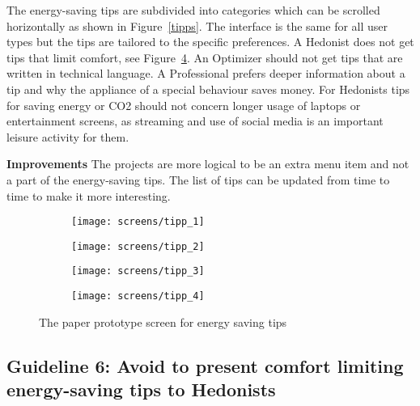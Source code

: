 The energy-saving tips are subdivided into categories which can be scrolled horizontally as shown in Figure~\ref{tipps}. The interface is the same for all user types but the tips are tailored to the specific preferences. A Hedonist does not get tips that limit comfort, see Figure~\ref{fig:tipps:hedonist}. An Optimizer should not get tips that are written in technical language. A Professional prefers deeper information about a tip and why the appliance of a special behaviour saves money. For Hedonists tips for saving energy or CO2 should not concern longer usage of laptops or entertainment screens, as streaming and use of social media is an important leisure activity for them.

\textbf{Improvements} \quad The projects are more logical to be an extra menu item and not a part of the energy-saving tips. The list of tips can be updated from time to time to make it more interesting.

\begin{figure}[h]
	\centering
	\begin{subfigure}[b]{0.24\columnwidth}
		\centering
		\texttt{[image: screens/tipp\_1]}
		\label{fig:tipps:professional}
	\end{subfigure}
	\begin{subfigure}[b]{0.24\columnwidth}
		\centering
		\texttt{[image: screens/tipp\_2]}
		\label{fig:tipps:optimizer}
	\end{subfigure}
	\begin{subfigure}[b]{0.24\columnwidth}
		\centering
		\texttt{[image: screens/tipp\_3]}
		\label{fig:tipps:indifferent}
	\end{subfigure}
	\begin{subfigure}[b]{0.24\columnwidth}
		\centering
		\texttt{[image: screens/tipp\_4]}
		\label{fig:tipps:hedonist}
	\end{subfigure}
	\caption{The paper prototype screen for energy saving tips}
	\label{fig:tipps} %
\end{figure}

\subsection*{Guideline 6: Avoid to present comfort limiting energy-saving tips to Hedonists}

